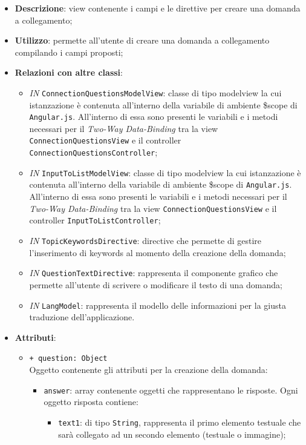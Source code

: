 \begin{itemize}
	\item \textbf{Descrizione}: view contenente i campi e le direttive per creare una domanda a collegamento;
	\item \textbf{Utilizzo}: permette all'utente di creare una domanda a collegamento compilando i campi proposti;
	\item \textbf{Relazioni con altre classi}:
	\begin{itemize}
		\item \textit{IN} \texttt{ConnectionQuestionsModelView}: classe di tipo modelview la cui istanzazione è contenuta all'interno della variabile di ambiente \$scope di \texttt{Angular.js}. All'interno di essa sono presenti le variabili e i metodi necessari per il \textit{Two-Way Data-Binding} tra la view \texttt{ConnectionQuestionsView} e il controller \texttt{ConnectionQuestionsController};
		\item \textit{IN} \texttt{InputToListModelView}: classe di tipo modelview la cui istanzazione è contenuta all'interno della variabile di ambiente \$scope di \texttt{Angular.js}. All'interno di essa sono presenti le variabili e i metodi necessari per il \textit{Two-Way Data-Binding} tra la view \texttt{ConnectionQuestionsView} e il controller \texttt{InputToListController};
		\item \textit{IN} \texttt{TopicKeywordsDirective}: directive che permette di gestire l'inserimento di keywords al momento della creazione della domanda;
		\item \textit{IN} \texttt{QuestionTextDirective}: rappresenta il componente grafico che permette all'utente di scrivere o modificare il testo di una domanda;
		\item \textit{IN} \texttt{LangModel}: rappresenta il modello delle informazioni per la giusta traduzione dell'applicazione.
	\end{itemize}
	\item \textbf{Attributi}:
	\begin{itemize}
		\item \texttt{+ question: Object} \\ Oggetto contenente gli attributi per la creazione della domanda:
		\begin{itemize}
			\item \texttt{answer}: array contenente oggetti che rappresentano le risposte. Ogni oggetto risposta contiene:
			\begin{itemize}
				\item \texttt{text1}: di tipo \texttt{String}, rappresenta il primo elemento testuale che sarà collegato ad un secondo elemento (testuale o immagine);

\end{itemize}
\end{itemize}
\end{itemize}
\end{itemize}
